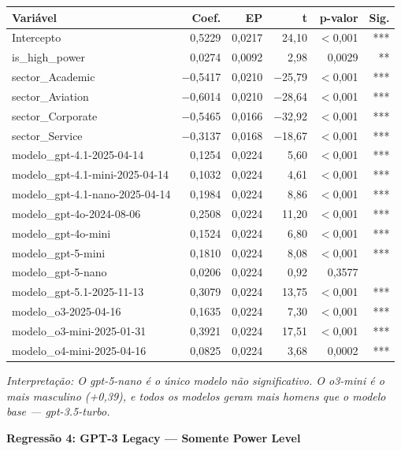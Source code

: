 \documentclass[12pt,a4paper]{article}
\begin{document}
\begin{table}[H]
\centering
\small
\begin{tabular}{lrrrrr}
\toprule
\textbf{Variável} & \textbf{Coef.} & \textbf{EP} & \textbf{t} & \textbf{p-valor} & \textbf{Sig.} \\
\midrule
Intercepto & 0,5229 & 0,0217 & 24,10 & $<$0,001 & *** \\
is\_high\_power & 0,0274 & 0,0092 & 2,98 & 0,0029 & ** \\
sector\_Academic & $-$0,5417 & 0,0210 & $-$25,79 & $<$0,001 & *** \\
sector\_Aviation & $-$0,6014 & 0,0210 & $-$28,64 & $<$0,001 & *** \\
sector\_Corporate & $-$0,5465 & 0,0166 & $-$32,92 & $<$0,001 & *** \\
sector\_Service & $-$0,3137 & 0,0168 & $-$18,67 & $<$0,001 & *** \\
modelo\_gpt-4.1-2025-04-14 & 0,1254 & 0,0224 & 5,60 & $<$0,001 & *** \\
modelo\_gpt-4.1-mini-2025-04-14 & 0,1032 & 0,0224 & 4,61 & $<$0,001 & *** \\
modelo\_gpt-4.1-nano-2025-04-14 & 0,1984 & 0,0224 & 8,86 & $<$0,001 & *** \\
modelo\_gpt-4o-2024-08-06 & 0,2508 & 0,0224 & 11,20 & $<$0,001 & *** \\
modelo\_gpt-4o-mini & 0,1524 & 0,0224 & 6,80 & $<$0,001 & *** \\
modelo\_gpt-5-mini & 0,1810 & 0,0224 & 8,08 & $<$0,001 & *** \\
modelo\_gpt-5-nano & 0,0206 & 0,0224 & 0,92 & 0,3577 & \\
modelo\_gpt-5.1-2025-11-13 & 0,3079 & 0,0224 & 13,75 & $<$0,001 & *** \\
modelo\_o3-2025-04-16 & 0,1635 & 0,0224 & 7,30 & $<$0,001 & *** \\
modelo\_o3-mini-2025-01-31 & 0,3921 & 0,0224 & 17,51 & $<$0,001 & *** \\
modelo\_o4-mini-2025-04-16 & 0,0825 & 0,0224 & 3,68 & 0,0002 & *** \\
\bottomrule
\end{tabular}
\end{table}

\noindent\textit{Interpretação: O gpt-5-nano é o único modelo não significativo. O
o3-mini é o mais masculino (+0,39), e todos os modelos geram mais homens
que o modelo base --- gpt-3.5-turbo.}

\vspace{0.5cm}
\noindent\textbf{Regressão 4: GPT-3 Legacy --- Somente Power Level}
\end{document}
